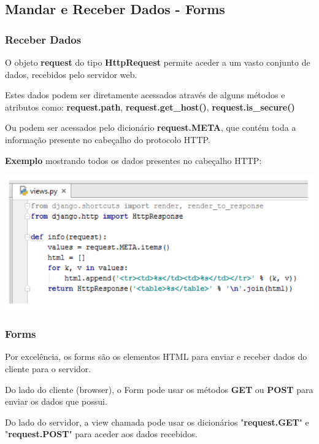 \documentclass{article}
\begin{document}
\pagebreak

\subsection{Mandar e Receber Dados - Forms}

\subsubsection{Receber Dados}

\begin{flushleft}
  O objeto \textbf{request} do tipo \textbf{HttpRequest} permite aceder
  a um vasto conjunto de dados, recebidos pelo servidor web.

  Estes dados podem ser diretamente acessados através de alguns métodos e atributos
  como: \textbf{request.path}, \textbf{request.get\_host()}, \textbf{request.is\_secure()}

  Ou podem ser acessados pelo dicionário \textbf{request.META}, que contém
  toda a informação presente no cabeçalho do protocolo HTTP.
  
  \vspace{2mm}
  \textbf{Exemplo} mostrando todos os dados presentes no cabeçalho HTTP:

  \begin{center}
    \includegraphics[scale=0.35]{12}
  \end{center}
\end{flushleft}

\subsubsection{Forms}

\begin{flushleft}
  Por excelência, os forms são os elementos HTML para enviar e receber dados
  do cliente para o servidor.

  Do lado do cliente (browser), o Form pode usar os métodos \textbf{GET} ou \textbf{POST} para
  enviar os dados que possui.

  Do lado do servidor, a view chamada pode usar os dicionários "\textbf{request.GET}" e "\textbf{request.POST}"
  para aceder aos dados recebidos.
\end{flushleft}
\end{document}
